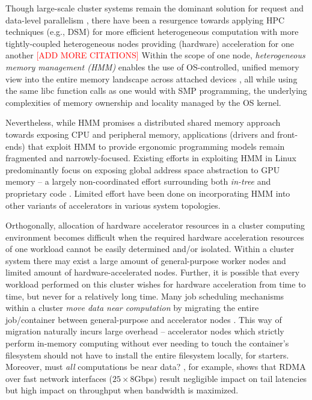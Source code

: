 \documentclass{article}
\begin{document}
Though large-scale cluster systems remain the dominant solution for request and
data-level parallelism \cite{BOOK.Hennessy_Patterson.CArch.2011},
there have been a resurgence towards applying HPC techniques (e.g., DSM) for more
efficient heterogeneous computation with more tightly-coupled heterogeneous nodes
providing (hardware) acceleration for one another \cite{Cabezas_etal.GPU-SM.2015}
\textcolor{red}{[ADD MORE CITATIONS]} Within the scope of one node,
\emph{heterogeneous memory management (HMM)} enables the use of OS-controlled,
unified memory view into the entire memory landscape across attached devices
\cite{WEB.NVIDIA.Harris.Unified_Memory_CUDA.2017}, all while using the same libc
function calls as one would with SMP programming, the underlying complexities of
memory ownership and locality managed by the OS kernel.

Nevertheless, while HMM promises a distributed shared memory approach towards
exposing CPU and peripheral memory, applications (drivers and front-ends) that
exploit HMM to provide ergonomic programming models remain fragmented and
narrowly-focused. Existing efforts in exploiting HMM in Linux predominantly focus
on exposing global address space abstraction to GPU memory -- a largely
non-coordinated effort surrounding both \textit{in-tree} and proprietary code
\cites{WEB.LWN.Corbet.HMM_GPL_woes.2018}{WEB.Phoronix..HMM_Search_Results.2023}.
Limited effort have been done on incorporating HMM into other variants of
accelerators in various system topologies.

Orthogonally, allocation of hardware accelerator resources in a cluster computing
environment becomes difficult when the required hardware acceleration resources
of one workload cannot be easily determined and/or isolated. Within a cluster
system there may exist a large amount of general-purpose worker nodes and limited
amount of hardware-accelerated nodes. Further, it is possible that every workload
performed on this cluster wishes for hardware acceleration from time to time,
but never for a relatively long time. Many job scheduling mechanisms within a cluster
\emph{move data near computation} by migrating the entire job/container between
general-purpose and accelerator nodes \cites{Rodriguez_etal.HPC_Cluster_Migration.2019}
{Oh_Kim.Container_Migration.2018}. This way of migration naturally incurs
large overhead -- accelerator nodes which strictly perform in-memory computing
without ever needing to touch the container's filesystem should not have to install
the entire filesystem locally, for starters. Moreover, must \emph{all} computations be
near data? \cite{Masouros_etal.Adrias.2023}, for example, shows that RDMA over
fast network interfaces ($25 \times 8$Gbps) result negligible impact on tail latencies
but high impact on throughput when bandwidth is maximized.
\end{document}
